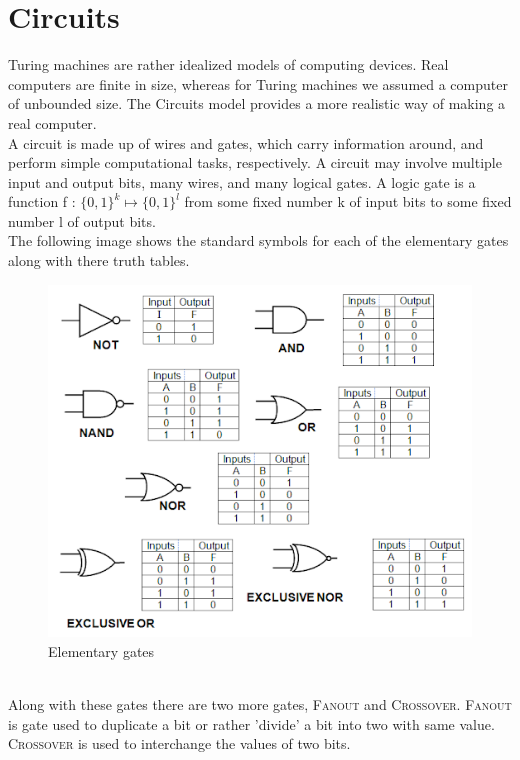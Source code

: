 
\section{Circuits}
Turing machines are rather idealized models of computing devices. Real computers are finite in size, whereas for Turing machines we assumed a computer of unbounded size. The Circuits model provides a more realistic way of making a real computer.\\
A circuit is made up of wires and gates, which carry information around, and perform simple computational tasks, respectively. A circuit may involve multiple input and output bits, many wires, and many logical gates. A logic gate is a function f : {$\{0, 1\}^k \longmapsto \{0, 1\}^l$} from some fixed number k of input bits to some fixed number l of output bits.\\
The following image shows the standard symbols for each of the elementary gates along with there truth tables.\\
\begin{figure}[h!]	
	\includegraphics[width=1\textwidth]{images/gate.png}\par
	\caption{Elementary gates}
	\label{fig:gate}
\end{figure}
\\Along with these gates there are two more gates, {\scshape Fanout} and {\scshape Crossover}. {\scshape Fanout} is gate used to duplicate a bit or rather 'divide' a bit into two with same value. {\scshape Crossover} is used to interchange the values of two bits.\\
